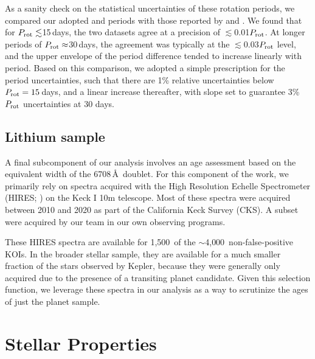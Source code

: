 \documentclass[11pt,twocolumn,tighten]{aastex63}
\newcommand{\nkoisnofp}{{$\sim$4{,}000}} %
\newcommand{\nkoiswithhires}{{1{,}500}}
\begin{document}
As a sanity check on the statistical uncertainties of these rotation
periods, we compared our adopted  and
 periods with those reported by
\citet{McQuillan_2014} and \citet{Mazeh_2015}.
We found that for $P_{\rm rot}\lesssim$15\,days, the two 
datasets agree at a precision of $\lesssim$0.01$P_{\rm rot}$.  At longer periods of 
$P_{\rm rot}\approx$30\,days, the agreement was typically at the
$\lesssim$0.03$P_{\rm rot}$ level, and
the upper envelope of the period difference tended to increase
linearly with period.
Based on this comparison, we adopted a simple prescription for the
period uncertainties,
such that there are 1\% relative uncertainties below $P_{\rm
rot}=15$\,days, and a linear increase thereafter, with slope set to
guarantee 3\% $P_{\rm rot}$ uncertainties at 30 days.



\subsection{Lithium sample}
A final subcomponent of our analysis involves an age assessment based on
the equivalent width of the  6708\,\AA\ doublet.  For this
component of the work, we primarily rely on spectra acquired with the
High Resolution Echelle Spectrometer (HIRES;
\citealt{vogt_hires_1994}) on the Keck I 10m telescope.
Most of these spectra were acquired between 2010 and 2020
as part of the California Keck Survey (CKS).
A subset were acquired by our team in our own observing programs.

These HIRES spectra are available for \nkoiswithhires\ of the
\nkoisnofp\ non-false-positive KOIs.
In the broader stellar sample, they are available for a much smaller 
fraction of the stars observed by Kepler, because they were generally only
acquired due to the presence of a transiting planet candidate.
Given this selection function,
we leverage these spectra in our analysis as a way to scrutinize the
ages of just the planet sample.



\section{Stellar Properties}
\label{sec:stellarprops}

\end{document}
